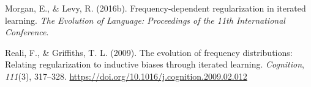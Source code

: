 \documentclass[
  jou,floatsintext]{apa6}
\newlength{\cslhangindent}
\newenvironment{CSLReferences}[2] %
 {\begin{list}{}{%
  \setlength{\itemindent}{0pt}
  \setlength{\leftmargin}{0pt}
  \setlength{\parsep}{0pt}
  \ifodd #1
   \setlength{\leftmargin}{\cslhangindent}
   \setlength{\itemindent}{-1\cslhangindent}
  \fi
  \setlength{\itemsep}{#2\baselineskip}}}
 {\end{list}}
\begin{document}
\begin{CSLReferences}{1}{0}
Morgan, E., \& Levy, R. (2016b). Frequency-dependent regularization in iterated learning. \emph{The Evolution of Language: Proceedings of the 11th International Conference}.

Reali, F., \& Griffiths, T. L. (2009). The evolution of frequency distributions: Relating regularization to inductive biases through iterated learning. \emph{Cognition}, \emph{111}(3), 317--328. \url{https://doi.org/10.1016/j.cognition.2009.02.012}

\end{CSLReferences}
\end{document}
